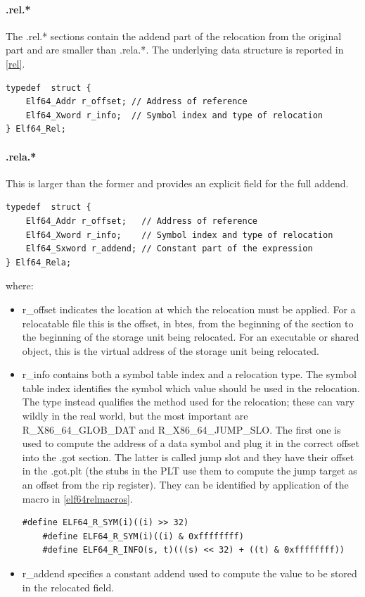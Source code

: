 \documentclass[paper=a4, fontsize=11pt]{report} %
\numberwithin{equation}{section} %
\numberwithin{figure}{section} %
\numberwithin{table}{section} %
\begin{document}
\paragraph{.rel.*}
The {\ttfamily .rel.*} sections contain the addend part of the relocation from 
the original part and are smaller than {\ttfamily .rela.*}. The underlying 
data structure is reported in \ref{rel}.
\begin{lstlisting}[style=ansic, caption={.rel.* entries}, label=rel]
typedef  struct {
	Elf64_Addr r_offset; // Address of reference
	Elf64_Xword r_info;  // Symbol index and type of relocation
} Elf64_Rel;
\end{lstlisting}
\paragraph{.rela.*}
This is larger than the former and provides an explicit field for the full 
addend.
\begin{lstlisting}[style=ansic, caption={.rel.* entries}, label=rel]
typedef  struct {
	Elf64_Addr r_offset;   // Address of reference
	Elf64_Xword r_info;    // Symbol index and type of relocation
	Elf64_Sxword r_addend; // Constant part of the expression
} Elf64_Rela;
\end{lstlisting}
where:
\begin{itemize}
	\item {\ttfamily r\_offset} indicates the location at which the relocation 
	must be applied. For a relocatable file this is the offset, in btes, from 
	the beginning of the section to the beginning of the storage unit being 
	relocated. For an executable or shared object, this is the virtual address 
	of the storage unit being relocated.
	\item {\ttfamily r\_info} contains both a symbol table index and a 
	relocation type. The symbol table index identifies the symbol which value 
	should be used in the relocation.
	The type instead qualifies the method used for the relocation; these can 
	vary wildly in the real world, but the most important are {\ttfamily 
	R\_X86\_64\_GLOB\_DAT} and {\ttfamily R\_X86\_64\_JUMP\_SLO}. 
	\subitem The first one is used to compute the address of a data symbol and 
	plug it in the correct offset into the {\ttfamily .got} section.
	\subitem The latter is called jump slot and they have their offset in the 
	{\ttfamily .got.plt} (the stubs in the PLT use them to compute the jump 
	target as an offset from the {\ttfamily rip} register).
	They can be identified by application of the macro in \ref{elf64relmacros}.
	\begin{lstlisting}[style=ansic,caption={Macros},label=elf64relmacros]
	#define ELF64_R_SYM(i)((i) >> 32)
	#define ELF64_R_SYM(i)((i) & 0xffffffff)
	#define ELF64_R_INFO(s, t)(((s) << 32) + ((t) & 0xffffffff))
	\end{lstlisting}
	\item {\ttfamily r\_addend} specifies a constant addend used to compute the 
	value to be stored in the relocated field.
\end{itemize}
\pagebreak
\end{document}
